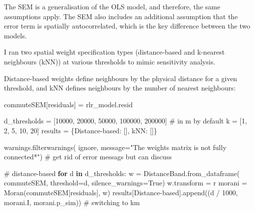 \documentclass[
  number]{elsarticle}
\newenvironment{Shaded}{\begin{snugshade}}{\end{snugshade}}
\newcommand{\CommentTok}[1]{\textcolor[rgb]{0.37,0.37,0.37}{#1}}
\newcommand{\ControlFlowTok}[1]{\textcolor[rgb]{0.00,0.23,0.31}{\textbf{#1}}}
\newcommand{\DecValTok}[1]{\textcolor[rgb]{0.68,0.00,0.00}{#1}}
\newcommand{\KeywordTok}[1]{\textcolor[rgb]{0.00,0.23,0.31}{\textbf{#1}}}
\newcommand{\NormalTok}[1]{\textcolor[rgb]{0.00,0.23,0.31}{#1}}
\newcommand{\OperatorTok}[1]{\textcolor[rgb]{0.37,0.37,0.37}{#1}}
\newcommand{\StringTok}[1]{\textcolor[rgb]{0.13,0.47,0.30}{#1}}
\newcommand{\VariableTok}[1]{\textcolor[rgb]{0.07,0.07,0.07}{#1}}
\begin{document}
The SEM is a generalisation of the OLS model, and therefore, the same
assumptions apply. The SEM also includes an additional assumption that
the error term is spatially autocorrelated, which is the key difference
between the two models.

I ran two spatial weight specification types (distance-based and
k-nearest neighbours (kNN)) at various thresholds to mimic sensitivity
analysis.

Distance-based weights define neighbours by the physical distance for a
given threshold, and kNN defines neighbours by the number of nearest
neighbours:

\begin{Shaded}
\begin{Highlighting}[]
\NormalTok{commuteSEM[}\StringTok{\textquotesingle{}residuals\textquotesingle{}}\NormalTok{] }\OperatorTok{=}\NormalTok{ rlr\_model.resid}

\NormalTok{d\_thresholds }\OperatorTok{=}\NormalTok{ [}\DecValTok{10000}\NormalTok{, }\DecValTok{20000}\NormalTok{, }\DecValTok{50000}\NormalTok{, }\DecValTok{100000}\NormalTok{, }\DecValTok{200000}\NormalTok{]  }\CommentTok{\# in m by default}
\NormalTok{k }\OperatorTok{=}\NormalTok{ [}\DecValTok{1}\NormalTok{, }\DecValTok{2}\NormalTok{, }\DecValTok{5}\NormalTok{, }\DecValTok{10}\NormalTok{, }\DecValTok{20}\NormalTok{]}
\NormalTok{results }\OperatorTok{=}\NormalTok{ \{}\StringTok{\textquotesingle{}Distance{-}based\textquotesingle{}}\NormalTok{: [], }\StringTok{\textquotesingle{}kNN\textquotesingle{}}\NormalTok{: []\}}

\NormalTok{warnings.filterwarnings(}
    \StringTok{\textquotesingle{}ignore\textquotesingle{}}\NormalTok{, message}\OperatorTok{=}\StringTok{"The weights matrix is not fully connected*"}\NormalTok{) }\CommentTok{\# get rid of error messags but can discuss}

\CommentTok{\# distance{-}based }
\ControlFlowTok{for}\NormalTok{ d }\KeywordTok{in}\NormalTok{ d\_thresholds:}
\NormalTok{    w }\OperatorTok{=}\NormalTok{ DistanceBand.from\_dataframe(}
\NormalTok{        commuteSEM, threshold}\OperatorTok{=}\NormalTok{d, silence\_warnings}\OperatorTok{=}\VariableTok{True}\NormalTok{)}
\NormalTok{    w.transform }\OperatorTok{=} \StringTok{\textquotesingle{}r\textquotesingle{}}
\NormalTok{    morani }\OperatorTok{=}\NormalTok{ Moran(commuteSEM[}\StringTok{\textquotesingle{}residuals\textquotesingle{}}\NormalTok{], w)}
\NormalTok{    results[}\StringTok{\textquotesingle{}Distance{-}based\textquotesingle{}}\NormalTok{].append((d }\OperatorTok{/} \DecValTok{1000}\NormalTok{, morani.I, morani.p\_sim)) }\CommentTok{\# switching to km}


\end{Highlighting}
\end{Shaded}
\end{document}

